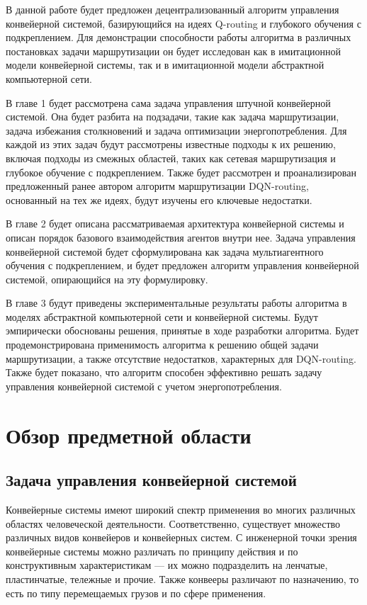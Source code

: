 \documentclass[specification,annotation,times]{itmo-student-thesis}
\theoremstyle{definition}
\begin{document}
В данной работе будет предложен децентрализованный алгоритм управления
конвейерной системой, базирующийся на идеях Q-routing и глубокого обучения с
подкреплением. Для демонстрации способности работы алгоритма в различных
постановках задачи маршрутизации он будет исследован как в имитационной модели
конвейерной системы, так и в имитационной модели абстрактной компьютерной сети.

В главе 1 будет рассмотрена сама задача управления штучной конвейерной системой.
Она будет разбита на подзадачи, такие как задача маршрутизации, задача
избежания столкновений и задача оптимизации энергопотребления. Для каждой из
этих задач будут рассмотрены известные подходы к их решению, включая подходы
из смежных областей, таких как сетевая маршрутизация и глубокое обучение с
подкреплением. Также будет рассмотрен и проанализирован предложенный ранее
автором алгоритм маршрутизации DQN-routing, основанный на тех же идеях, будут
изучены его ключевые недостатки.

В главе 2 будет описана рассматриваемая архитектура конвейерной системы и
описан порядок базового взаимодействия агентов внутри нее. Задача управления
конвейерной системой будет сформулирована как задача мультиагентного обучения с
подкреплением, и будет предложен алгоритм управления конвейерной системой,
опирающийся на эту формулировку.

В главе 3 будут приведены экспериментальные результаты работы алгоритма в
моделях абстрактной компьютерной сети и конвейерной системы. Будут
эмпирически обоснованы решения, принятые в ходе разработки алгоритма. Будет
продемонстрирована применимость алгоритма к решению общей задачи маршрутизации,
а также отсутствие недостатков, характерных для DQN-routing. Также будет
показано, что алгоритм способен эффективно решать задачу управления конвейерной
системой с учетом энергопотребления.

\chapter{Обзор предметной области}

\startrelatedwork

\section{Задача управления конвейерной системой}\label{problem-statement}

Конвейерные системы имеют широкий спектр применения во многих различных областях
человеческой деятельности. Соответственно, существует множество различных видов
конвейеров и конвейерных систем. С инженерной точки зрения конвейерные системы
можно различать по принципу действия и по конструктивным характеристикам
--- их можно подразделить на ленчатые, пластинчатые, тележные и прочие.
Также конвееры различают по назначению, то есть по типу перемещаемых грузов и по
сфере применения.
\end{document}
